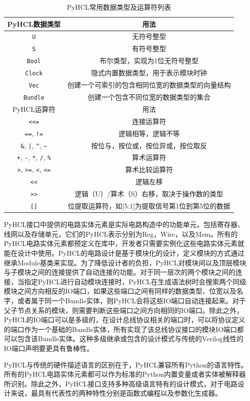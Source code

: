 \begin{table}
	\caption{PyHCL常用数据类型及运算符列表}
	\centering
	\small 
	\begin{tabular}{cc}
		\hline 
		PyHCL数据类型 & 用法 \tabularnewline
		\hline 
		\texttt{U} & 无符号整型  \tabularnewline
		\texttt{S} & 有符号整型  \tabularnewline
		\texttt{Bool} & 布尔类型，实现为1位无符号整型  \tabularnewline
		\texttt{Clock} & 隐式内置数据类型，用于表示模块时钟  \tabularnewline
		\texttt{Vec} & 创建一个可索引的包含相同位宽的数据类型的向量结构 \tabularnewline
		\texttt{Bundle}  & 创建一个包含不同位宽的数据类型的集合 \tabularnewline
		\hline
		PyHCL运算符 & 用法 \tabularnewline
		\texttt{<<=} & 连接运算符 \tabularnewline
		\texttt{==}, \texttt{!=} & 逻辑相等，逻辑不等 \tabularnewline
		\texttt{\&}, \texttt{|}, \texttt{\^}, \texttt{\~} & 按位与，按位或，按位异或，按位取反 \tabularnewline
		\texttt{+}, \texttt{-}, \texttt{*}, \texttt{/}, \texttt{\%} & 算术运算符 \tabularnewline
		\texttt{>}, \texttt{>=}, \texttt{<}, \texttt{<=} & 算术比较运算符 \tabularnewline
		\texttt{<<}& 逻辑左移 \tabularnewline
		\texttt{>>} & 逻辑（U）/算术（S）右移，取决于操作数的类型  \tabularnewline
		\texttt{[]} & 位提取运算符，如[5:1]为提取信号第1位到第5位的数据 \tabularnewline
		\hline 
	\end{tabular}
\end{table}

PyHCL接口中提供的电路实体元素是实际电路构造中的功能单元，包括寄存器、线网以及存储单元，它们的PyHCL表示分别为Reg，Wire，以及Mem。所有的PyHCL电路实体元素都预定义在库中，开发者只需要实例化这些电路实体元素就能在设计中使用。PyHCL的电路设计是基于模块化的设计，定义模块的方式通过继承Module基类来实现。为了降低设计者的负担，PyHCL对模块间以及顶层模块与子模块之间的连接提供了自动连接的功能。对于同一层次的两个模块之间的连接，当指定PyHCL进行自动模块连接时，PyHCL在生成语法树时会搜索两个同级模块之间方向相反的IO端口，如果这些端口之间有同样的数据类型、位宽以及名字，或者属于同一个Bundle实体，则PyHCL会将这些IO端口自动连接起来。对于父子节点关系的模块，则需要判断这些端口之间方向相同的IO端口。除此之外，PyHCL的IO端口可以是多级的，在设计总线协议相关的端口时，可以将协议定义的端口作为一个基础的Bundle实体，所有实现了该总线协议接口的模块IO端口都可以包含该Bundle实体。这种多级继承或包含的设计模式与传统的Verilog线性的IO端口声明要更具有鲁棒性。

PyHCL与传统的硬件描述语言的区别在于，PyHCL兼容所有Python的语言特性。所有的PyHCL电路实体元素都可以作为标准的Python内置变量或者实体被解释器所识别。除此之外，PyHCL接口支持多种高级语言特有的设计模式，对于电路设计来说，最具有代表性的两种特性分别是函数式编程以及参数化生成器。

